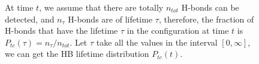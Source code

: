 {\begin{figure}
{At time $t$, we assume that there are totally $n_{tot}$ H-bonds can be detected, and $n_{\tau}$ H-bonds are of lifetime $\tau$, therefore,  the fraction of H-bonds that 
have the lifetime $\tau$ in the configuration at time $t$ is $P_{tc}(\tau) =  n_{\tau} /n_{tot}$.
Let $\tau$ take all the values in the interval $[0,\infty]$, we can get the HB lifetime distribution $P_{tc}(t)$.
}
\end{figure}
%

}
